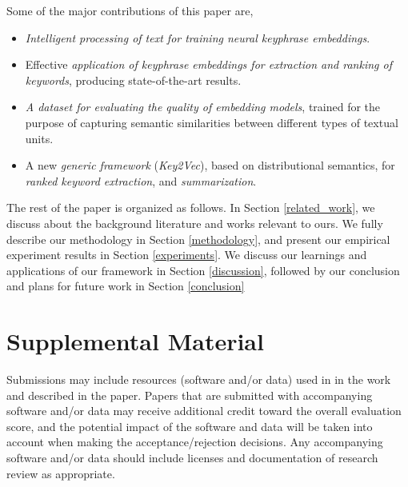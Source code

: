 \documentclass[11pt,a4paper]{article}
\begin{document}
Some of the major contributions of this paper are,
\begin{itemize}
  \item \textit{Intelligent processing of text for training neural keyphrase embeddings}.
  \item Effective \textit{application of keyphrase embeddings for extraction and ranking of keywords}, producing state-of-the-art results.
  \item \textit{A dataset for evaluating the quality of embedding models}, trained for the purpose of capturing semantic similarities between different types of textual units.
  \item A new \textit{generic framework} (\textit{Key2Vec}), based on distributional semantics, for \textit{ranked keyword extraction}, and \textit{summarization}.
\end{itemize}

The rest of the paper is organized as follows. In Section \ref{related_work}, we discuss about the background literature and works relevant to ours. We fully describe our methodology in Section \ref{methodology}, and present our empirical experiment results in Section \ref{experiments}. We discuss our learnings and applications of our framework in Section \ref{discussion}, followed by our conclusion and plans for future work in Section \ref{conclusion}



%
%



\appendix

\section{Supplemental Material}
\label{sec:supplemental}
Submissions may include resources (software and/or data) used in in the work and described in the paper. Papers that are submitted with accompanying software and/or data may receive additional credit toward the overall evaluation score, and the potential impact of the software and data will be taken into account when making the acceptance/rejection decisions. Any accompanying software and/or data should include licenses and documentation of research review as appropriate.
\end{document}
